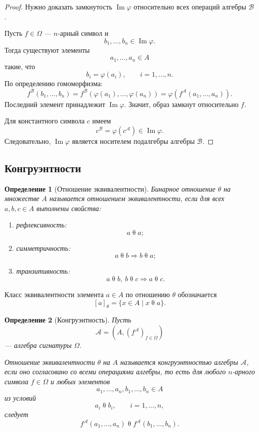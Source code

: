 \documentclass[12pt,a4paper]{article}
\newtheorem{definition}{Определение}
\begin{document}
\begin{proof}
Нужно доказать замкнутость $\operatorname{Im}\varphi$ относительно всех операций алгебры $\mathcal B$.

Пусть $f\in\Omega$ --- $n$-арный символ и
\[
b_1,\dots,b_n\in \operatorname{Im}\varphi.
\]
Тогда существуют элементы
\[
a_1,\dots,a_n\in A
\]
такие, что
\[
b_i=\varphi(a_i),\qquad i=1,\dots,n.
\]
По определению гомоморфизма:
\[
f^{\mathcal B}(b_1,\dots,b_n)
=
f^{\mathcal B}(\varphi(a_1),\dots,\varphi(a_n))
=
\varphi(f^{\mathcal A}(a_1,\dots,a_n)).
\]
Последний элемент принадлежит $\operatorname{Im}\varphi$. Значит, образ замкнут относительно $f$.

Для константного символа $c$ имеем
\[
c^{\mathcal B}=\varphi(c^{\mathcal A})\in \operatorname{Im}\varphi.
\]
Следовательно, $\operatorname{Im}\varphi$ является носителем подалгебры алгебры $\mathcal B$.
\end{proof}

\subsection{Конгруэнтности}

\begin{definition}[Отношение эквивалентности]
Бинарное отношение $\theta$ на множестве $A$ называется \emph{отношением эквивалентности}, если для всех $a,b,c\in A$ выполнены свойства:
\begin{enumerate}
    \item рефлексивность:
    \[
    a\mathrel{\theta}a;
    \]
    \item симметричность:
    \[
    a\mathrel{\theta}b \Rightarrow b\mathrel{\theta}a;
    \]
    \item транзитивность:
    \[
    a\mathrel{\theta}b,\ b\mathrel{\theta}c
    \Rightarrow
    a\mathrel{\theta}c.
    \]
\end{enumerate}
\end{definition}

Класс эквивалентности элемента $a\in A$ по отношению $\theta$ обозначается
\[
[a]_\theta=\{x\in A\mid x\mathrel{\theta}a\}.
\]

\begin{definition}[Конгруэнтность]
Пусть
\[
\mathcal A=(A,(f^{\mathcal A})_{f\in\Omega})
\]
--- алгебра сигнатуры $\Omega$.

Отношение эквивалентности $\theta$ на $A$ называется \emph{конгруэнтностью} алгебры $\mathcal A$, если оно согласовано со всеми операциями алгебры, то есть для любого $n$-арного символа $f\in\Omega$ и любых элементов
\[
a_1,\dots,a_n,b_1,\dots,b_n\in A
\]
из условий
\[
a_i\mathrel{\theta}b_i,\qquad i=1,\dots,n,
\]
следует
\[
f^{\mathcal A}(a_1,\dots,a_n)
\mathrel{\theta}
f^{\mathcal A}(b_1,\dots,b_n).
\]
\end{definition}
\end{document}
